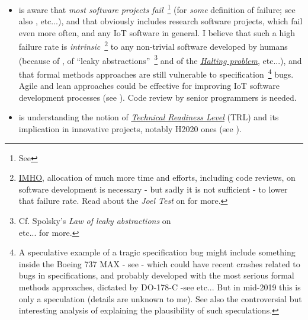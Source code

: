 \begin{itemize}
    \item is aware that \emph{most software projects
    fail}~\footnote{See
    }
      (for \emph{some} definition of failure; see also
      \cite{Brooks:1995:MM, Khan:2016-GSEPIM,
        Attarzadeh:2008:proj-man}, etc...), and that obviously
      includes research software projects, which fail even more often,
      and any IoT software in general. I believe that such a high
      failure rate is
      \emph{intrinsic}~\footnote{\href{https://en.wiktionary.org/wiki/IMHO}{IMHO},
      allocation of much more time and efforts, including code
      reviews, on software development is necessary - but sadly it is
      not sufficient - to lower that failure rate. Read about the
      \emph{Joel Test} on
      for more.}  to any non-trivial software developed by humans
      (because of \cite{Braun:1956:magical-seven}, of ``leaky
      abstractions''~\footnote{Cf. Spolsky's \emph{Law of leaky
      abstractions}  on
      \\ 
      etc... for more.}  and of the
      \href{https://en.wikipedia.org/wiki/Halting\_problem}{\emph{Halting
        problem}}, etc...), and that formal methods approaches are
      still vulnerable   to
      specification~\footnote{A speculative example of a tragic
      specification bug might include something inside the Boeing 737
      MAX - see 
      - which could have recent crashes related to bugs in
      specifications, and probably developed with the most serious
      formal methods approaches, dictated by DO-178-C -see
       etc... But in
      mid-2019 this is only a speculation (details are unknown to
      me). See also the controversial but interesting analysis of
      \cite{graeber:2018:bullshit} explaining the plausibility of such
      speculations.}  bugs. Agile and lean approaches could be
      effective for improving IoT software development processes (see
      \cite{Rodriguez:2019:AgileLean}).  Code
      review by senior programmers is needed.
      

    \item is understanding the notion of
      \href{https://en.wikipedia.org/wiki/Technology\_readiness\_level}{\emph
        {Technical Readiness Level}}  (TRL) and its
      implication in innovative projects, notably H2020  ones (see
      \cite{Heder:2017:TRL}).


\end{itemize}

